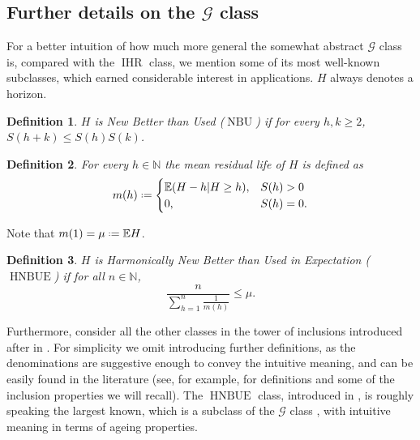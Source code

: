 \documentclass[11pt, a4paper, twoside]{article}
\newcommand*{\defeq}{\mathrel{\vcenter{\baselineskip0.5ex \lineskiplimit0pt
			\hbox{\scriptsize.}\hbox{\scriptsize.}}}=}
\newcommand{\NN}{\mathbb{N}}
\newcommand{\EE}{\mathbb{E}}
\newcommand{\PGF}{\mathcal{G}}
\DeclareMathOperator{\IHR}{IHR}
\DeclareMathOperator{\NBU}{NBU}
\DeclareMathOperator{\HNBUE}{HNBUE}
\newtheorem{definition}{Definition}[section]
\numberwithin{equation}{section}
\begin{document}
	\subsection{Further details on the $\PGF$ class}\label{suppGclassdetails}
    For a better intuition of how much more general the somewhat abstract $\PGF$ class is, compared with the $\IHR$ class, we mention some of its most well-known subclasses, which earned considerable interest in applications. $H$ always denotes a horizon.
	\begin{definition}
		$H$ is \emph{New Better than Used ($\NBU$)} if for every $h,k\ge2$, $S(h+k)\le S(h)S(k)$.
	\end{definition}
	\begin{definition}
		For every $h\in\NN$ the \emph{mean residual life} of $H$ is defined as
		\[m(h)\defeq\begin{cases}
			\EE(H-h|H\ge h),&S(h)>0\\
			0,&S(h)=0.\end{cases}\]
	\end{definition}
	Note that $m(1)=\mu\defeq \EE H$.
	\begin{definition}\label{HNBUEdef}
		$H$ is \emph{Harmonically New Better than Used in Expectation ($\HNBUE$)} if for all $n\in\NN$, \[\frac{n}{\sum_{h=1}^n\frac{1}{m(h)}}\le \mu.\]
	\end{definition}
	Furthermore, consider all the other classes in the tower of inclusions introduced after  in . For simplicity we omit introducing further definitions, as the denominations are suggestive enough to convey the intuitive meaning, and can be easily found in the literature (see, for example, \cite{BraqRoyXie01} for definitions and some of the inclusion properties we will recall). The $\HNBUE$ class, introduced in \cite{Rol75}, is roughly speaking the largest known, which is a subclass of the $\PGF$ class \cite{Klef82}, with intuitive meaning in terms of ageing properties.
\end{document}
